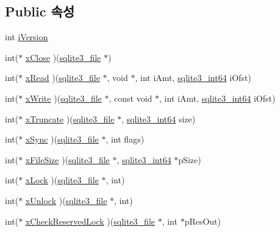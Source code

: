 \subsection*{Public 속성}
\begin{DoxyCompactItemize}
\item 
int \hyperlink{structsqlite3__io__methods_ad1c72bdfde750a09a797f314a096a965}{i\+Version}
\item 
int($\ast$ \hyperlink{structsqlite3__io__methods_ae0673b03bfa033d59188bfdab418cd26}{x\+Close} )(\hyperlink{structsqlite3__file}{sqlite3\+\_\+file} $\ast$)
\item 
int($\ast$ \hyperlink{structsqlite3__io__methods_ac1433ffc0da0414a2a67a46d338d83eb}{x\+Read} )(\hyperlink{structsqlite3__file}{sqlite3\+\_\+file} $\ast$, void $\ast$, int i\+Amt, \hyperlink{sqlite3_8h_a0a4d3e6c1ad46f90e746b920ab6ca0d2}{sqlite3\+\_\+int64} i\+Ofst)
\item 
int($\ast$ \hyperlink{structsqlite3__io__methods_a659f6a40777b685c6a6b80e5f07a3328}{x\+Write} )(\hyperlink{structsqlite3__file}{sqlite3\+\_\+file} $\ast$, const void $\ast$, int i\+Amt, \hyperlink{sqlite3_8h_a0a4d3e6c1ad46f90e746b920ab6ca0d2}{sqlite3\+\_\+int64} i\+Ofst)
\item 
int($\ast$ \hyperlink{structsqlite3__io__methods_abe797948913bfe94d4fab7246773af50}{x\+Truncate} )(\hyperlink{structsqlite3__file}{sqlite3\+\_\+file} $\ast$, \hyperlink{sqlite3_8h_a0a4d3e6c1ad46f90e746b920ab6ca0d2}{sqlite3\+\_\+int64} size)
\item 
int($\ast$ \hyperlink{structsqlite3__io__methods_ad4b78f6b0b475e621fe29fb1cc886437}{x\+Sync} )(\hyperlink{structsqlite3__file}{sqlite3\+\_\+file} $\ast$, int flags)
\item 
int($\ast$ \hyperlink{structsqlite3__io__methods_ae875f158de72435f40ca0bd5207d9862}{x\+File\+Size} )(\hyperlink{structsqlite3__file}{sqlite3\+\_\+file} $\ast$, \hyperlink{sqlite3_8h_a0a4d3e6c1ad46f90e746b920ab6ca0d2}{sqlite3\+\_\+int64} $\ast$p\+Size)
\item 
int($\ast$ \hyperlink{structsqlite3__io__methods_ac88793475b0c4188fb02c229f1a11e8b}{x\+Lock} )(\hyperlink{structsqlite3__file}{sqlite3\+\_\+file} $\ast$, int)
\item 
int($\ast$ \hyperlink{structsqlite3__io__methods_a5ce75a5ca2df9c1edcaef74d4c0d7e38}{x\+Unlock} )(\hyperlink{structsqlite3__file}{sqlite3\+\_\+file} $\ast$, int)
\item 
int($\ast$ \hyperlink{structsqlite3__io__methods_a484752731e4a054c97497ad8d48a344b}{x\+Check\+Reserved\+Lock} )(\hyperlink{structsqlite3__file}{sqlite3\+\_\+file} $\ast$, int $\ast$p\+Res\+Out)

\end{DoxyCompactItemize}
